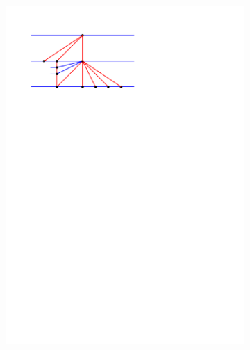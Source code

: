 \begin{figure}[!b]
\begin{subfigure}[t]{0.23 \textwidth}
        \includegraphics[width = \textwidth]{topFanFlips/img/newFlip/bBigBefore}
    \end{subfigure}
    ~
    \begin{subfigure}[t]{0.23 \textwidth}

\end{subfigure}
\end{figure}
